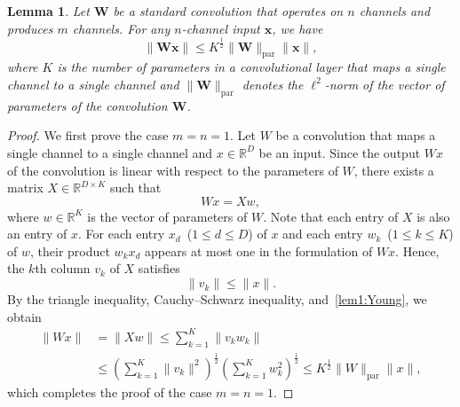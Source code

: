 \documentclass[preprint,12pt,authoryear]{elsarticle}
\numberwithin{equation}{section}
\newtheorem{lemma}[theorem]{Lemma}
\theoremstyle{remark}
\newcommand\bW{\mathbf{W}}
\newcommand\bx{\mathbf{x}}
\newcommand\param{\mathrm{par}}
\begin{document}
\begin{lemma}
\label{lem:Young}
Let $\bW$ be a standard convolution that operates on $n$ channels and produces $m$ channels.
For any $n$-channel input $\bx$, we have
\begin{equation*}
\| \bW \bx \| \leq K^{\frac{1}{2}} \| \bW \|_{\param} \| \bx \|,
\end{equation*}
where $K$ is the number of parameters in a convolutional layer that maps a single channel to a single channel and $\| \bW \|_{\param}$ denotes the $\ell^2$-norm of the vector of parameters of the convolution $\bW$.
\end{lemma}
\begin{proof}
    We first prove the case $m = n =1$.
    Let $W$ be a convolution that maps a single channel to a single channel and $x \in \mathbb{R}^D$ be an input.
    Since the output $Wx$ of the convolution is linear with respect to the parameters of $W$, there exists a matrix $X \in \mathbb{R}^{D \times K}$ such that
    \begin{equation*}
        W x = X w,
    \end{equation*}
    where $w \in \mathbb{R}^K$ is the vector of parameters of $W$.
    Note that each entry of $X$ is also an entry of $x$.
    For each entry $x_d$~($1 \leq d \leq D$) of $x$ and each entry $w_k$~($1 \leq k \leq K$) of $w$, their product $w_k x_d$ appears at most one in the formulation of $W x$.
    Hence, the $k$th column $v_k$ of $X$ satisfies
    \begin{equation}
        \label{lem1:Young}
        \| v_k \| \leq \| x \|.
    \end{equation}
    By the triangle inequality, Cauchy--Schwarz inequality, and~\eqref{lem1:Young}, we obtain
    \begin{equation}
        \label{lem2:Young}
        \begin{split}
        \| W x \| &= \| X w \| \leq \sum_{k=1}^K \| v_k w_k \| \\
        &\leq \left( \sum_{k=1}^K \| v_k \|^2 \right)^{\frac{1}{2}} \left( \sum_{k=1}^K w_k^2 \right)^{\frac{1}{2}}
        \leq K^{\frac{1}{2}} \| W \|_{\param} \| x \|,
        \end{split}
    \end{equation}
    which completes the proof of the case $m = n = 1$.


\end{proof}
\end{document}
